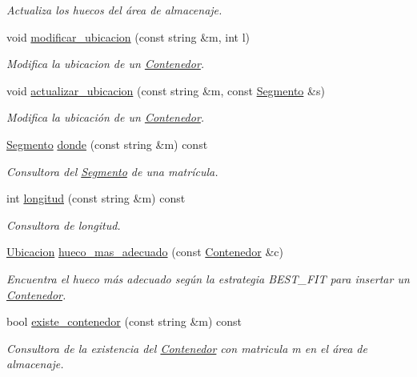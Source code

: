 \begin{DoxyCompactItemize}
\begin{DoxyCompactList}\small\item\em Actualiza los huecos del área de almacenaje. \end{DoxyCompactList}\item 
void \hyperlink{class_almacenaje_a4e225d0899f7c49b3c513ed61f63b4ef}{modificar\+\_\+ubicacion} (const string \&m, int l)
\begin{DoxyCompactList}\small\item\em Modifica la ubicacion de un \hyperlink{class_contenedor}{Contenedor}. \end{DoxyCompactList}\item 
void \hyperlink{class_almacenaje_a4035979df0e66a26d4b98d2b18d3d408}{actualizar\+\_\+ubicacion} (const string \&m, const \hyperlink{class_segmento}{Segmento} \&s)
\begin{DoxyCompactList}\small\item\em Modifica la ubicación de un \hyperlink{class_contenedor}{Contenedor}. \end{DoxyCompactList}\item 
\hyperlink{class_segmento}{Segmento} \hyperlink{class_almacenaje_afe08e4bca255d4baf3750019622e6cb2}{donde} (const string \&m) const
\begin{DoxyCompactList}\small\item\em Consultora del \hyperlink{class_segmento}{Segmento} de una matrícula. \end{DoxyCompactList}\item 
int \hyperlink{class_almacenaje_a745cf4e181058d391aed220843d6cede}{longitud} (const string \&m) const
\begin{DoxyCompactList}\small\item\em Consultora de longitud. \end{DoxyCompactList}\item 
\hyperlink{class_ubicacion}{Ubicacion} \hyperlink{class_almacenaje_a8a62209a8e83a59eb900913c3dc5f377}{hueco\+\_\+mas\+\_\+adecuado} (const \hyperlink{class_contenedor}{Contenedor} \&c)
\begin{DoxyCompactList}\small\item\em Encuentra el hueco más adecuado según la estrategia B\+E\+S\+T\+\_\+\+F\+IT para insertar un \hyperlink{class_contenedor}{Contenedor}. \end{DoxyCompactList}\item 
bool \hyperlink{class_almacenaje_aa846d1cf215bd139527d2607d4cee833}{existe\+\_\+contenedor} (const string \&m) const
\begin{DoxyCompactList}\small\item\em Consultora de la existencia del \hyperlink{class_contenedor}{Contenedor} con matricula {\itshape m} en el área de almacenaje. \end{DoxyCompactList}\item 

\end{DoxyCompactItemize}
